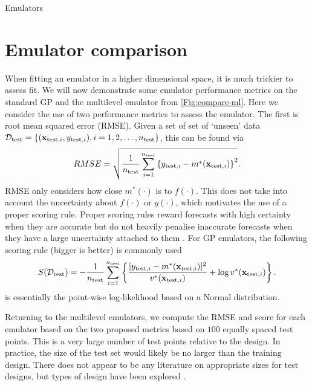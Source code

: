 \begin{chapter}{Emulators \label{Ch:Emulators}}
\section{Emulator comparison}
When fitting an emulator in a higher dimensional space, it is much trickier to assess fit. We will now demonstrate some emulator performance metrics on the standard GP and the multilevel emulator from \cref{Fig:compare-ml}. Here we consider the use of two performance metrics to assess the emulator. The first is root mean squared error (RMSE). Given a set of set of `unseen' data $\mathcal{D}_{\text{test}} = \{ (\mathbf{x}_{\text{test},i}, y_{\text{test},i}), i = 1, 2, \ldots, n_{\text{test}} \} $, this can be found via
\begin{equation}
  RMSE = \sqrt{ \frac{1}{n_\text{test}}  \sum_{i = 1}^{n_\text{test}} \left\{ y_{\text{test},i} - m^*( \mathbf{x}_{\text{test},i} )  \right\}^2 }. \label{Eq:rmse}
\end{equation}
RMSE only considers how close $m^{*}(\cdot)$ is to $f(\cdot)$. This does not take into account the uncertainty about $f(\cdot)$ or $y(\cdot)$, which motivates the use of a proper scoring rule. Proper scoring rules reward forecasts with high certainty when they are accurate but do not heavily penalise inaccurate forecasts when they have a large uncertainty attached to them \citep{Gneiting2007}. For GP emulators, the following scoring rule (bigger is better) is commonly used \citep{Binois2018,Jackson2019}
\begin{equation}
  S(\mathcal{D}_\text{test}) = -\frac{1}{n_{\text{test}}}\sum_{i = 1}^{n_\text{test}}\left\{ \frac{[y_{\text{test},i} - m^*(\mathbf{x}_{\text{test},i} ) ]^2}{v^*(\mathbf{x}_{\text{test},i})} + \log v^*(\mathbf{x}_{\text{test},i})\right\}.\label{Eq:scoring-rule}
\end{equation}
 is essentially the point-wise log-likelihood based on a Normal distribution. 

Returning to the multilevel emulators, we compute the RMSE and score for each emulator based on the two proposed metrics based on $100$ equally spaced test points. This is a very large number of test points relative to the design. In practice, the size of the test set would likely be no larger than the training design. There does not appear to be any literature on appropriate sizes for test designs, but types of design have been explored \citep{Challenor2013}.


\end{chapter}
